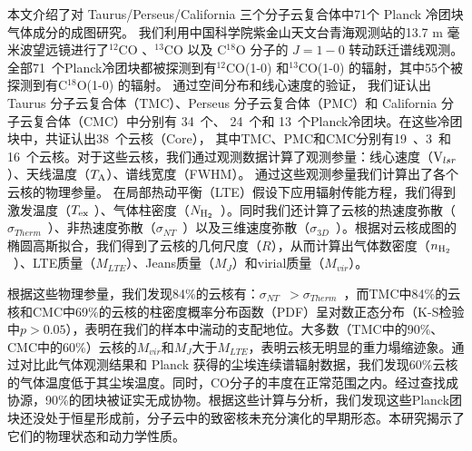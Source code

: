 \documentclass[UTF8]{pkuthss}
\newcommand{\coa}{$^{12}$CO }
\newcommand{\cob}{$^{13}$CO }
\newcommand{\coc}{C$^{18}$O }
\newcommand{\coaa}{$^{12}$CO(1-0) }
\newcommand{\cobb}{$^{13}$CO(1-0) }
\newcommand{\cocc}{C$^{18}$O(1-0) }
\newcommand{\vlsr}{${\rm V } _{lsr}$}
\newcommand{\ta}{$T_{\rm A}$}
\newcommand{\texc}{$T_{\rm {ex}}$ }
\newcommand{\nhyd}{$N_{\rm H_2}$\ }
\newcommand{\nnhyd}{$n_{\rm H_2}$\ }
\newcommand{\sigmath}{$\sigma _{Therm}$\ }
\newcommand{\sigmant}{$\sigma _{NT}$\ }
\newcommand{\sigmatd}{$\sigma _{3D}$\ }
\newcommand{\numsou}{71\ }
\newcommand{\numsoutmc}{34\ }
\newcommand{\numsoupmc}{13\ }
\newcommand{\numsoucmc}{24\ }
\newcommand{\numcore}{38\ }
\newcommand{\numcoretmc}{19\ }
\newcommand{\numcorepmc}{3\ }
\newcommand{\numcorecmc}{16\ }
\begin{document}
	\frontmatter
	\maketitle

\begin{cabstract}

	本文介绍了对 Taurus/Perseus/California 三个分子云复合体中71个 Planck 冷团块气体成分的成图研究。 我们利用中国科学院紫金山天文台青海观测站的13.7 m 毫米波望远镜进行了\coa、\cob 以及 \coc 分子的 $J=1-0$ 转动跃迁谱线观测。全部\numsou 个Planck冷团块都被探测到有\coaa 和\cobb 的辐射，其中55个被探测到有\cocc 的辐射。 通过空间分布和线心速度的验证， 我们证认出 Taurus 分子云复合体（TMC）、Perseus 分子云复合体（PMC）和 California 分子云复合体（CMC）中分别有 \numsoutmc 个、 \numsoucmc 个和 \numsoupmc 个Planck冷团块。在这些冷团块中，共证认出\numcore 个云核（Core）， 其中TMC、PMC和CMC分别有\numcoretmc、\numcorepmc 和\numcorecmc 个云核。对于这些云核，我们通过观测数据计算了观测参量：线心速度（\vlsr ）、天线温度（\ta ）、谱线宽度（FWHM）。 通过这些观测参量我们计算出了各个云核的物理参量。 在局部热动平衡（LTE）假设下应用辐射传能方程，我们得到激发温度（\texc ）、气体柱密度（\nhyd ）。同时我们还计算了云核的热速度弥散（\sigmath ）、非热速度弥散（\sigmant ）以及三维速度弥散（\sigmatd ）。根据对云核成图的椭圆高斯拟合，我们得到了云核的几何尺度（$R$），从而计算出气体数密度（\nnhyd ）、LTE质量（$M_{LTE}$）、Jeans质量（$M_{J}$）和virial质量（$M_{vir}$）。

	根据这些物理参量，我们发现84\%的云核有：\sigmant $>$\sigmath ，而TMC中84\%的云核和CMC中69\%的云核的柱密度概率分布函数（PDF）呈对数正态分布（K-S检验中$p>0.05$），表明在我们的样本中湍动的支配地位。大多数（TMC中的90\%、CMC中的60\%）云核的$M_{vir}$和$M_{J}$大于$M_{LTE}$，表明云核无明显的重力塌缩迹象。通过对比此气体观测结果和 Planck 获得的尘埃连续谱辐射数据，我们发现60\%云核的气体温度低于其尘埃温度。同时，CO分子的丰度在正常范围之内。经过查找成协源，90\%的团块被证实无成协物。根据这些计算与分析，我们发现这些Planck团块还没处于恒星形成前，分子云中的致密核未充分演化的早期形态。本研究揭示了它们的物理状态和动力学性质。
\end{cabstract}
\end{document}
